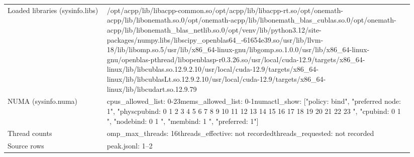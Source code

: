\begin{longtable}{>{\raggedright\arraybackslash}p{0.23\linewidth}>{\raggedright\arraybackslash}p{0.71\linewidth}}
Loaded libraries (sysinfo.libs) & /\allowbreak{}opt/\allowbreak{}acpp/\allowbreak{}lib/\allowbreak{}libacpp-common.so\newline /\allowbreak{}opt/\allowbreak{}acpp/\allowbreak{}lib/\allowbreak{}libacpp-rt.so\newline /\allowbreak{}opt/\allowbreak{}onemath-acpp/\allowbreak{}lib/\allowbreak{}libonemath.so.0\newline /\allowbreak{}opt/\allowbreak{}onemath-acpp/\allowbreak{}lib/\allowbreak{}libonemath\_\allowbreak{}blas\_\allowbreak{}cublas.so.0\newline /\allowbreak{}opt/\allowbreak{}onemath-acpp/\allowbreak{}lib/\allowbreak{}libonemath\_\allowbreak{}blas\_\allowbreak{}netlib.so.0\newline /\allowbreak{}opt/\allowbreak{}venv/\allowbreak{}lib/\allowbreak{}python3.12/\allowbreak{}site-packages/\allowbreak{}numpy.libs/\allowbreak{}libscipy\_\allowbreak{}openblas64\_\allowbreak{}-61654e39.so\newline /\allowbreak{}usr/\allowbreak{}lib/\allowbreak{}llvm-18/\allowbreak{}lib/\allowbreak{}libomp.so.5\newline /\allowbreak{}usr/\allowbreak{}lib/\allowbreak{}x86\_\allowbreak{}64-linux-gnu/\allowbreak{}libgomp.so.1.0.0\newline /\allowbreak{}usr/\allowbreak{}lib/\allowbreak{}x86\_\allowbreak{}64-linux-gnu/\allowbreak{}openblas-pthread/\allowbreak{}libopenblasp-r0.3.26.so\newline /\allowbreak{}usr/\allowbreak{}local/\allowbreak{}cuda-12.9/\allowbreak{}targets/\allowbreak{}x86\_\allowbreak{}64-linux/\allowbreak{}lib/\allowbreak{}libcublas.so.12.9.2.10\newline /\allowbreak{}usr/\allowbreak{}local/\allowbreak{}cuda-12.9/\allowbreak{}targets/\allowbreak{}x86\_\allowbreak{}64-linux/\allowbreak{}lib/\allowbreak{}libcublasLt.so.12.9.2.10\newline /\allowbreak{}usr/\allowbreak{}local/\allowbreak{}cuda-12.9/\allowbreak{}targets/\allowbreak{}x86\_\allowbreak{}64-linux/\allowbreak{}lib/\allowbreak{}libcudart.so.12.9.79 \\
NUMA (sysinfo.numa) & cpus\_\allowbreak{}allowed\_\allowbreak{}list: 0-23\newline mems\_\allowbreak{}allowed\_\allowbreak{}list: 0-1\newline numactl\_\allowbreak{}show: ["policy: bind", "preferred node: 1", "physcpubind: 0 1 2 3 4 5 6 7 8 9 10 11 12 13 14 15 16 17 18 19 20 21 22 23 ", "cpubind: 0 1 ", "nodebind: 0 1 ", "membind: 1 ", "preferred: 1"] \\
Thread counts & omp\_\allowbreak{}max\_\allowbreak{}threads: 16\newline threads\_\allowbreak{}effective: not recorded\newline threads\_\allowbreak{}requested: not recorded \\
Source rows & peak.jsonl: 1–2 \\
\end{longtable}
